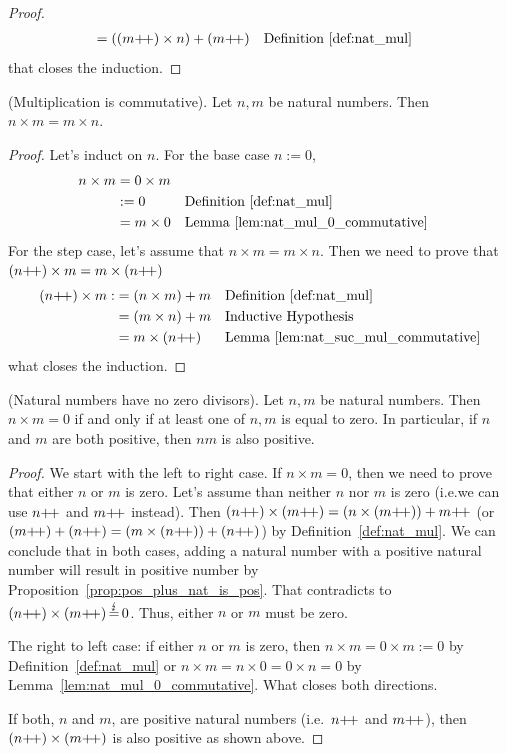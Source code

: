 \begin{subsequence}
\begin{proof}
\begin{align*}
            &= ((m\operatorname{\!+\!+}) \times n) + (m\operatorname{\!+\!+}) && \text{Definition~\ref{def:nat_mul}}
        \end{align*}
        that closes the induction.
    \end{proof}
    \begin{lemma}
        \textup{(Multiplication is commutative)}. Let $n, m$ be natural numbers. Then $n\times m = m \times n$.\label{lem:nat_mul_commutative}
    \end{lemma}
    \begin{proof}
        Let's induct on $n$. For the base case $n:=0$, 
        \begin{align*}
            n\times m &= 0 \times m\\
            & := 0 &&\text{Definition~\ref{def:nat_mul}}\\
            &= m \times 0&&\text{Lemma~\ref{lem:nat_mul_0_commutative}}
        \end{align*}
        For the step case, let's assume that $n\times m = m \times n$. Then we need to prove that $(n\operatorname{\!+\!+}) \times m = m \times (n\operatorname{\!+\!+})$
        \begin{align*}
           (n\operatorname{\!+\!+}) \times m :&= (n\times m) + m &&\text{Definition~\ref{def:nat_mul}}\\
           &= (m\times n) + m && \text{Inductive Hypothesis}\\
           &= m \times (n\operatorname{\!+\!+}) && \text{Lemma~\ref{lem:nat_suc_mul_commutative}}
        \end{align*}
        what closes the induction.
    \end{proof}
\end{subsequence}
\begin{lemma}
    \textup{(Natural numbers have no zero divisors)}. Let $n, m$ be natural numbers. Then $n \times m = 0$ if and only if at least one of $n, m$ is equal to zero. In particular, if $n$ and $m$ are both positive, then $nm$ is also positive.
\end{lemma}
\begin{proof}
    We start with the left to right case. If $n \times m = 0$, then we need to prove that either $n$ or $m$ is zero. Let's assume than neither $n$ nor $m$ is zero (i.e.\@ we can use $n\operatorname{\!+\!+}$ and $m\operatorname{\!+\!+}$ instead). Then $(n\next) \times (m\next) = (n\times (m\next)) + m\next$ (or $(m\next) + (n\next) = (m \times (n\next)) + (n\next)$) by Definition~\ref{def:nat_mul}. We can conclude that in both cases, adding a natural number with a positive natural number will result in positive number by Proposition~\ref{prop:pos_plus_nat_is_pos}. That contradicts to $(n\operatorname{\!+\!+}) \times (m\operatorname{\!+\!+})\operatorname{\stackrel{\lightning}{=}} 0$. Thus, either $n$ or $m$ must be zero.

    The right to left case: if either $n$ or $m$ is zero, then $n\times m = 0 \times m := 0$ by Definition~\ref{def:nat_mul} or $n \times m = n \times 0 = 0 \times n = 0$ by Lemma~\ref{lem:nat_mul_0_commutative}. What closes both directions. 
    
    If both, $n$ and $m$, are positive natural numbers (i.e.~$n\operatorname{\!+\!+}$ and $m\operatorname{\!+\!+}$), then $(n\operatorname{\!+\!+})\times(m\operatorname{\!+\!+})$ is also positive as shown above.
\end{proof}

